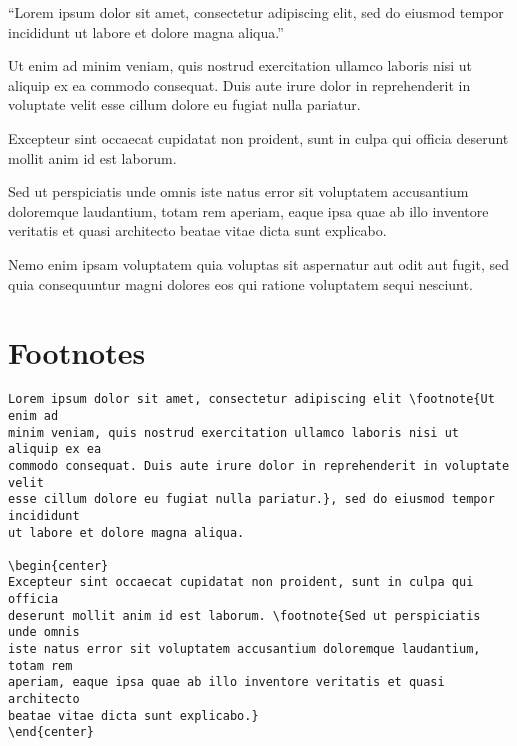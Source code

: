 ``Lorem ipsum dolor sit amet, consectetur adipiscing elit,
sed do eiusmod tempor incididunt ut labore et dolore magna aliqua.''

\begin{flushleft}
Ut enim ad minim veniam, quis nostrud exercitation ullamco laboris nisi ut
aliquip ex ea commodo consequat. Duis aute irure dolor in reprehenderit in
voluptate velit esse cillum dolore eu fugiat nulla pariatur.
\end{flushleft}

\begin{center}
Excepteur sint occaecat cupidatat non proident, sunt in culpa qui officia
deserunt mollit anim id est laborum.
\end{center}

\begin{flushright}
Sed ut perspiciatis unde omnis iste natus error sit voluptatem accusantium
doloremque laudantium, totam rem aperiam, eaque ipsa quae ab illo inventore
veritatis et quasi architecto beatae vitae dicta sunt explicabo.
\end{flushright}

Nemo enim ipsam voluptatem quia voluptas sit aspernatur aut odit aut fugit,
sed quia consequuntur magni dolores eos qui ratione voluptatem sequi nesciunt.

\section*{Footnotes}

\begin{lstlisting}[caption={Some footnotes.}]
Lorem ipsum dolor sit amet, consectetur adipiscing elit \footnote{Ut enim ad
minim veniam, quis nostrud exercitation ullamco laboris nisi ut aliquip ex ea
commodo consequat. Duis aute irure dolor in reprehenderit in voluptate velit
esse cillum dolore eu fugiat nulla pariatur.}, sed do eiusmod tempor incididunt
ut labore et dolore magna aliqua.

\begin{center}
Excepteur sint occaecat cupidatat non proident, sunt in culpa qui officia
deserunt mollit anim id est laborum. \footnote{Sed ut perspiciatis unde omnis
iste natus error sit voluptatem accusantium doloremque laudantium, totam rem
aperiam, eaque ipsa quae ab illo inventore veritatis et quasi architecto
beatae vitae dicta sunt explicabo.}
\end{center}
\end{lstlisting}

